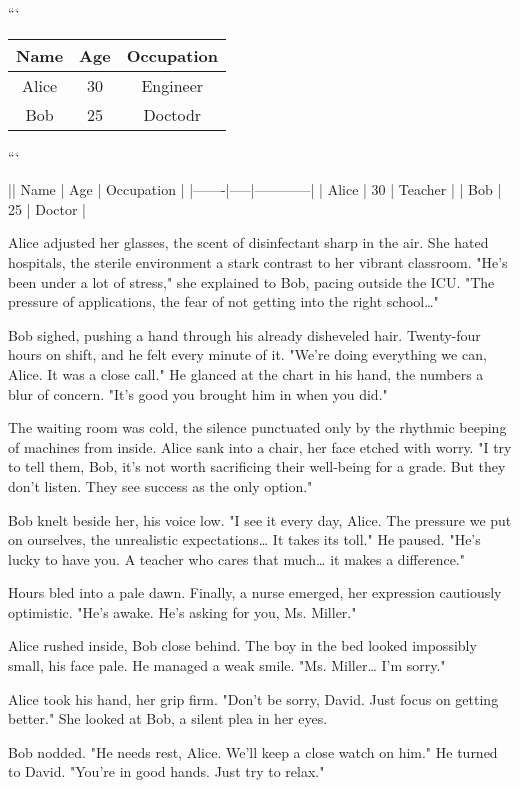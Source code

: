 \documentclass{article}
\begin{document}
```
\begin{tabular}{ccc}
    \hline
    Name & Age & Occupation \\
    \hline
    Alice & 30 & Engineer \\
    Bob & 25 & Doctodr \\
    \hline
\end{tabular}
```

|| Name  | Age | Occupation |
|-------|-----|------------|
| Alice | 30  | Teacher    |
| Bob   | 25  | Doctor     |

Alice adjusted her glasses, the scent of disinfectant sharp in the air. She hated hospitals, the sterile environment a stark contrast to her vibrant classroom. "He's been under a lot of stress," she explained to Bob, pacing outside the ICU. "The pressure of applications, the fear of not getting into the right school…"

Bob sighed, pushing a hand through his already disheveled hair. Twenty-four hours on shift, and he felt every minute of it. "We're doing everything we can, Alice. It was a close call." He glanced at the chart in his hand, the numbers a blur of concern. "It's good you brought him in when you did."

The waiting room was cold, the silence punctuated only by the rhythmic beeping of machines from inside. Alice sank into a chair, her face etched with worry. "I try to tell them, Bob, it's not worth sacrificing their well-being for a grade. But they don't listen. They see success as the only option."

Bob knelt beside her, his voice low. "I see it every day, Alice. The pressure we put on ourselves, the unrealistic expectations… It takes its toll." He paused. "He's lucky to have you. A teacher who cares that much… it makes a difference."

Hours bled into a pale dawn. Finally, a nurse emerged, her expression cautiously optimistic. "He's awake. He's asking for you, Ms. Miller."

Alice rushed inside, Bob close behind. The boy in the bed looked impossibly small, his face pale. He managed a weak smile. "Ms. Miller… I’m sorry."

Alice took his hand, her grip firm. "Don't be sorry, David. Just focus on getting better." She looked at Bob, a silent plea in her eyes.

Bob nodded. "He needs rest, Alice. We’ll keep a close watch on him." He turned to David. "You're in good hands. Just try to relax."
\end{document}

